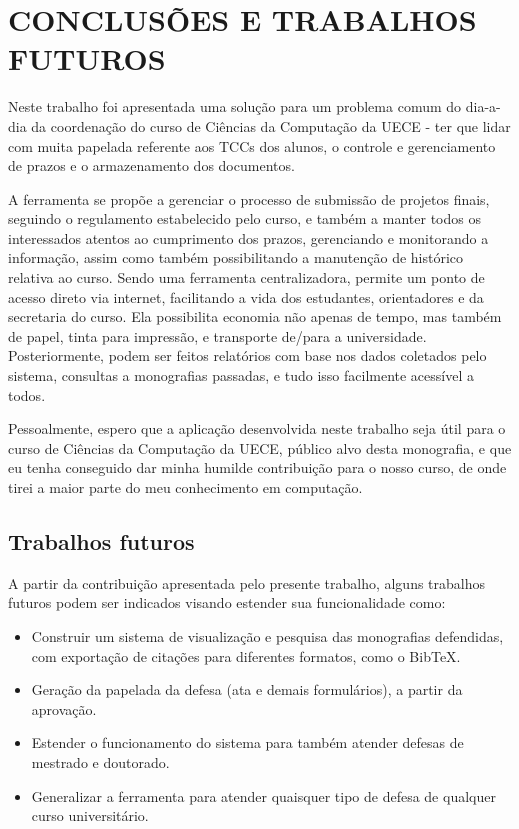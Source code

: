 \chapter{CONCLUSÕES E TRABALHOS FUTUROS}
\label{cha:conclusoes}

Neste trabalho foi apresentada uma solução para um problema comum do dia-a-dia
da coordenação do curso de Ciências da Computação da UECE - ter que lidar com
muita papelada referente aos TCCs dos alunos, o controle e gerenciamento de prazos
e o armazenamento dos documentos.

A ferramenta se propõe a gerenciar o processo de submissão de projetos finais, seguindo
o regulamento estabelecido pelo curso, e também a manter todos os interessados atentos ao cumprimento
dos prazos, gerenciando e monitorando a informação, assim como também possibilitando
a manutenção de histórico relativa ao curso. Sendo uma ferramenta centralizadora,
permite um ponto de acesso direto via internet, facilitando a vida dos estudantes,
orientadores e da secretaria do curso. Ela possibilita economia não apenas de tempo,
mas também de papel, tinta para impressão, e transporte de/para a universidade.
Posteriormente, podem ser feitos relatórios com base nos dados coletados pelo sistema,
consultas a monografias passadas, e tudo isso facilmente acessível a todos.

Pessoalmente, espero que a aplicação desenvolvida neste trabalho seja útil
para o curso de Ciências da Computação da UECE, público alvo desta monografia, 
e que eu tenha conseguido dar minha humilde contribuição para o nosso curso,
de onde tirei a maior parte do meu conhecimento em computação.

\section{Trabalhos futuros}
A partir da contribuição apresentada pelo presente trabalho, alguns
trabalhos futuros podem ser indicados visando estender sua funcionalidade como:

\begin{itemize}
\item Construir um sistema de visualização e pesquisa das monografias defendidas, 
com exporta\-ção de citações para diferentes formatos, como o {\sc Bib}\TeX.
\item Geração da papelada da defesa (ata e demais formulários), a partir da aprovação.
\item Estender o funcionamento do sistema para também atender defesas de mestrado e doutorado.
\item Generalizar a ferramenta para atender quaisquer tipo de defesa de qualquer curso universitário.
\end{itemize}
